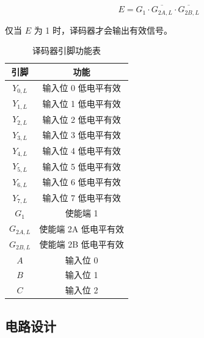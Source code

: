 \documentclass[12pt, a4paper]{ctexart}
\begin{document}
\begin{equation}
    E=G_1\cdot\overline{G_{2A,L}}\cdot\overline{G_{2B,L}}
\end{equation}

仅当 $E$ 为 1 时，译码器才会输出有效信号。

\begin{table}[H]
    \centering
    \begin{tabular}{|c|c|}
        \hline
        引脚 & 功能 \\
        \hline
        $Y_{0,L}$ & 输入位 0 低电平有效 \\
        $Y_{1,L}$ & 输入位 1 低电平有效 \\
        $Y_{2,L}$ & 输入位 2 低电平有效 \\
        $Y_{3,L}$ & 输入位 3 低电平有效 \\
        $Y_{4,L}$ & 输入位 4 低电平有效 \\
        $Y_{5,L}$ & 输入位 5 低电平有效 \\
        $Y_{6,L}$ & 输入位 6 低电平有效 \\
        $Y_{7,L}$ & 输入位 7 低电平有效 \\
        \hline
        $G_1$ & 使能端 1 \\
        $G_{2A,L}$ & 使能端 2A 低电平有效 \\
        $G_{2B,L}$ & 使能端 2B 低电平有效 \\
        \hline
        $A$ & 输入位 0 \\
        $B$ & 输入位 1 \\
        $C$ & 输入位 2 \\
        \hline
    \end{tabular}
    \caption{译码器引脚功能表}
\end{table}

\subsection{电路设计}
\end{document}
